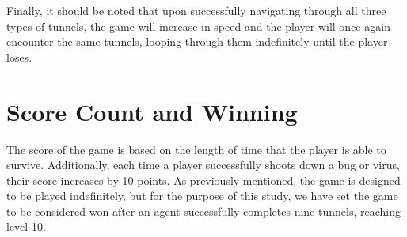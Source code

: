 Finally, it should be noted that upon successfully navigating through all three types of tunnels, the game will increase in speed and the player will once again encounter the same tunnels, looping through them indefinitely until the player loses.

\section{Score Count and Winning}
The score of the game is based on the length of time that the player is able to survive. Additionally, each time a player successfully shoots down a bug or virus, their score increases by 10 points. As previously mentioned, the game is designed to be played indefinitely, but for the purpose of this study, we have set the game to be considered won after an agent successfully completes nine tunnels, reaching level 10.
